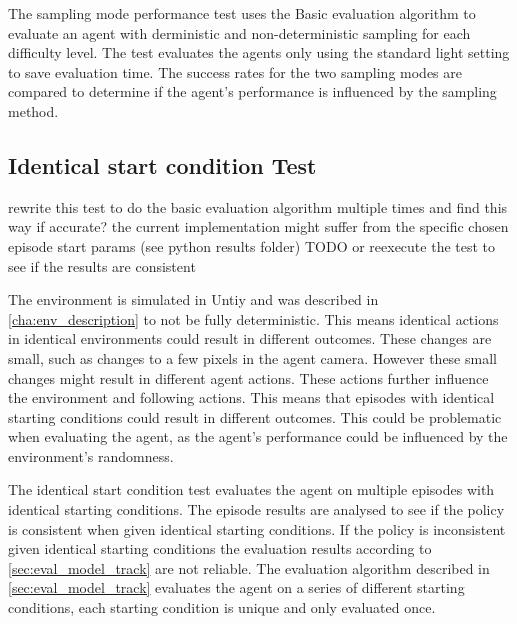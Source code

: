 The sampling mode performance test uses the Basic evaluation algorithm to evaluate an agent with derministic and non-deterministic sampling for each difficulty level. The test evaluates the agents only using the standard light setting to save evaluation time. The success rates for the two sampling modes are compared to determine if the agent's performance is influenced by the sampling method.






\subsection{Identical start condition Test}

rewrite this test to do the basic evaluation algorithm multiple times and find this way if accurate?
the current implementation might suffer from the specific chosen episode start params (see python results folder) TODO
or reexecute the test to see if the results are consistent

The environment is simulated in Untiy and was described in \ref{cha:env_description} to not be fully deterministic. This means identical actions in identical environments could result in different outcomes. These changes are small, such as changes to a few pixels in the agent camera. However these small changes might result in different agent actions. These actions further influence the environment and following actions. This means that episodes with identical starting conditions could result in different outcomes. This could be problematic when evaluating the agent, as the agent's performance could be influenced by the environment's randomness.

The identical start condition test evaluates the agent on multiple episodes with identical starting conditions. The episode results are analysed to see if the policy is consistent when given identical starting conditions. If the policy is inconsistent given identical starting conditions the evaluation results according to \ref{sec:eval_model_track} are not reliable. The evaluation algorithm described in \ref{sec:eval_model_track} evaluates the agent on a series of different starting conditions, each starting condition is unique and only evaluated once.


